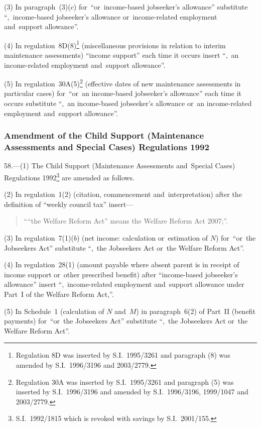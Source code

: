 \documentclass[12pt,a4paper]{article}
\begin{document}
(3) In paragraph~(3)($c$)  for~“or~income-based jobseeker’s allowance” substitute “,~income-based jobseeker’s allowance or~income-related employment and~support allowance”.

(4) In regulation~8D(8)\footnote{Regulation 8D was inserted by S.I.~1995/3261 and paragraph (8) was amended by S.I.~1996/3196 and 2003/2779.} (miscellaneous provisions in relation to interim maintenance assessments) “income support” each time it occurs insert “,~an income-related employment and~support allowance”.

(5) In regulation~30A(5)\footnote{Regulation 30A was inserted by S.I.~1995/3261 and paragraph (5) was inserted by S.I.~1996/3196 and amended by S.I.~1996/3196, 1999/1047 and 2003/2779.} (effective dates of new maintenance assessments in particular cases) for~“or~an income-based jobseeker’s allowance” each time it occurs substitute “,~an income-based jobseeker’s allowance or~an income-related employment and~support allowance”.

\subsubsection[58. Amendment of the Child Support (Maintenance Assessments and Special Cases) Regulations 1992]{Amendment of the Child Support (Maintenance Assessments and Special Cases) Regulations 1992}

58.---(1)  The Child Support (Maintenance Assessments and~Special Cases) Regulations 1992\footnote{S.I.~1992/1815 which is revoked with savings by S.I.~2001/155.} are amended as follows.

(2) In regulation~1(2) (citation, commencement and~interpretation) after the definition of “weekly council tax” insert—
\begin{quotation}
““the Welfare Reform Act” means the Welfare Reform Act 2007;”.
\end{quotation}

(3) In regulation~7(1)($b$)  (net income: calculation or~estimation of $N$) for~“or~the Jobseekers Act” substitute “,~the Jobseekers Act or~the Welfare Reform Act”.

(4) In regulation~28(1) (amount payable where absent parent is in receipt of income support or~other prescribed benefit) after “income-based jobseeker’s allowance” insert “,~income-related employment and~support allowance under Part~I of the Welfare Reform Act,”.

(5) In Schedule~1 (calculation of $N$ and~$M$) in paragraph~6(2) of Part~II (benefit payments) for~“or~the Jobseekers Act” substitute “,~the Jobseekers Act or~the Welfare Reform Act”.
\end{document}
